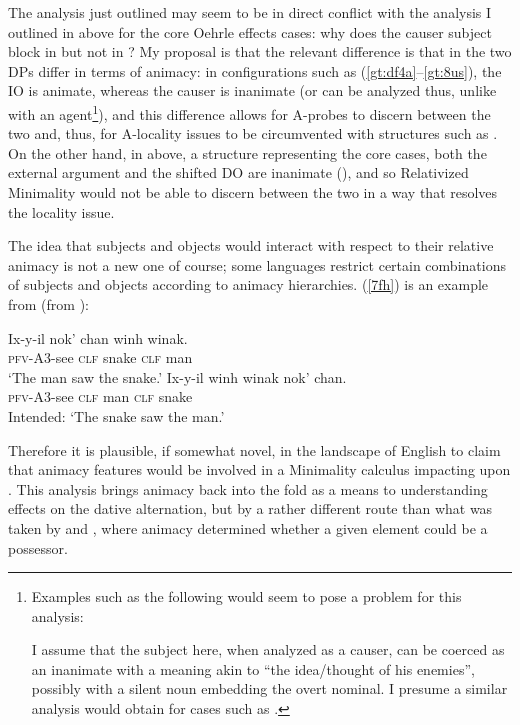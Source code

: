 \documentclass[output=paper,colorlinks,citecolor=brown]{langscibook}
\begin{document}
The analysis just outlined may seem to be in direct conflict with the analysis I outlined in  above for the core Oehrle effects cases: why does the causer subject block  in  but not in ? My proposal is that the relevant difference is that in  the two DPs differ in terms of animacy: in configurations such as (\ref{gt:df4a}--\ref{gt:8us}), the IO is animate, whereas the causer is inanimate (or can be analyzed thus, unlike with an agent\footnote{Examples such as the following would seem to pose a problem for this analysis: 


\noindent I assume that the subject here, when analyzed as a causer, can be coerced as an inanimate with a meaning akin to ``the idea/thought of his enemies'', possibly with a silent noun embedding the overt nominal. I presume a similar analysis would obtain for cases such as . }), and this difference allows for A-probes to discern between the two and, thus, for A-locality issues to be circumvented with structures such as . On the other hand, in  above, a structure representing the core  cases, both the external argument and the shifted DO are inanimate (), and so Relativized Minimality would not be able to discern between the two in a way that resolves the locality issue.

The idea that subjects and objects would interact with respect to their relative animacy is not a new one of course; some languages restrict certain combinations of subjects and objects according to animacy hierarchies. (\ref{7fh}) is an example from  (from \citealt{gt:Deal:2023}): 

\ea \label{7fh}
\ea
\gll Ix-y-il nok' chan winh winak. \\
 \textsc{pfv-A3}-see \textsc{clf} snake \textsc{clf} man \\
\glt `The man saw the snake.'
\ex
\gll *Ix-y-il winh winak nok' chan. \\
\textsc{pfv-A3}-see \textsc{clf} man \textsc{clf} snake \\ 
\glt Intended: `The snake saw the man.'
\z
\z

\noindent Therefore it is plausible, if somewhat novel, in the landscape of English to claim that animacy features would be involved in a Minimality calculus impacting upon . This analysis brings animacy back into the fold as a means to understanding effects on the dative alternation, but by a rather different route than what was taken by \citet{gt:Oehrle:1976} and \citet{gt:Harley:2002a}, where animacy determined whether a given element could be a possessor. 
\end{document}
